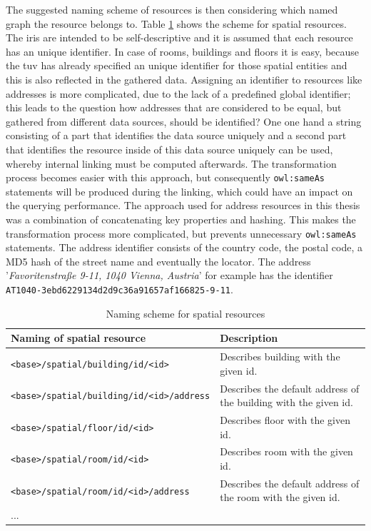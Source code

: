 \documentclass[draft,final]{vutinfth} %
\begin{document}
The suggested naming scheme of resources is then considering which named graph the resource belongs to. Table \ref{tab:architectural-prototype:resource-naming-scheme} shows the scheme for spatial resources. The \gls{iri}s are intended to be self-descriptive and it is assumed that each resource has an unique identifier. In case of rooms, buildings and floors it is easy, because the \gls{tuv} has already  specified an unique identifier for those spatial entities and this is also reflected in the gathered data. Assigning an identifier to resources like addresses is more complicated, due to the lack of a predefined global identifier; this leads to the question how addresses that are considered to be equal, but gathered from different data sources, should be identified? One one hand a string consisting of a part that identifies the data source uniquely and a second part that identifies the resource inside of this data source uniquely can be used, whereby internal linking must be computed afterwards. The transformation process becomes easier with this approach, but consequently \texttt{owl:sameAs} statements will be produced during the linking, which could have an impact on the querying performance. The approach used for address resources in this thesis was a combination of concatenating key properties and hashing. This makes the transformation process more complicated, but prevents unnecessary \texttt{owl:sameAs} statements. The address identifier consists of the country code, the postal code, a MD5 hash of the street name and eventually the locator. The address  '\textit{Favoritenstraße 9-11, 1040 Vienna, Austria}' for example has the identifier \texttt{AT1040-3ebd6229134d2d9c36a91657af166825-9-11}.

\begin{table}
  \centering
  \begin{tabular}{lp{6cm}}
    \toprule
    Naming of spatial resource & Description \\
    \midrule
    \texttt{<base>/spatial/building/id/<id>} & Describes building with the given id.\\
    \texttt{<base>/spatial/building/id/<id>/address} & Describes the default address of the building with the given id.\\    
    \texttt{<base>/spatial/floor/id/<id>} & Describes floor with the given id.\\
    \texttt{<base>/spatial/room/id/<id>} & Describes room with the given id.\\
        \texttt{<base>/spatial/room/id/<id>/address} & Describes the default address of the room with the given id.\\ 
    ...\\
    \bottomrule
  \end{tabular}
  \caption{Naming scheme for spatial resources}
  \label{tab:architectural-prototype:resource-naming-scheme}
\end{table}
\end{document}
